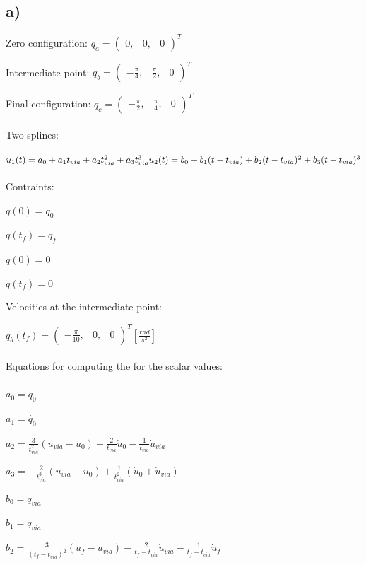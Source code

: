 \documentclass[a4paper,10pt]{article}
\begin{document}
\subsection*{a)}
Zero configuration:
$q_a =
\begin{pmatrix}
	0,&0,&0
\end{pmatrix}^T
$

Intermediate point:
$q_b = 
\begin{pmatrix}
-\frac{\pi}{4}, &\frac{\pi}{2}, &0
\end{pmatrix}^T
$

Final configuration:
$q_c =
\begin{pmatrix}
-\frac{\pi}{2},&\frac{\pi}{4},&0
\end{pmatrix}^T
$
\\~\\
Two splines:

$
u_1(t) = a_0 +a_1t_{via} + a_2 t_{via}^2 + a_3 t_{via}^3\\
u_2(t) = b_0 +b_1(t-t_{via}) + b_2 (t-t_{via})^2 + b_3 (t-t_{via})^3
$
\\~\\
Contraints:

$q(0)=q_0$

$q(t_f)=q_f$

$\dot{q}(0)=0$

$\dot{q}(t_f)=0$



Velocities at the intermediate point:

$\dot{q}_b(t_f)=
\begin{pmatrix}
-\frac{\pi}{10},&0,&0
\end{pmatrix}^T [\frac{rad}{s^2}]
$
\\~\\
Equations for computing the for the scalar values:
\\~\\
$a_0=q_0$

$a_1=\dot{q_0}$

$a_2=\frac{3}{t_{via}^2}(u_{via}-u_0)-\frac{2}{t_{via}}\dot{u}_0-\frac{1}{t_{via}}\dot{u}_{via}$

$a_3=-\frac{2}{t_{via}^3}(u_{via}-u_0)+\frac{1}{t_{via}^2}(\dot{u}_0+\dot{u}_{via})$

$b_0=q_{via}$

$b_1=\dot{q}_{via}$

$b_2=\frac{3}{(t_f-t_{via})^2}(u_{f}-u_{via})-\frac{2}{t_f-t_{via}}\dot{u}_{via}-\frac{1}{t_f-t_{via}}\dot{u}_{f}$
\end{document}

